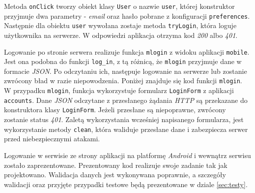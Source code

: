 

\vspace{1em}
Metoda \texttt{onClick} tworzy obiekt klasy \texttt{User} o nazwie \texttt{user}, której konstruktor przyjmuje dwa parametry - \emph{e\-mail} oraz hasło pobrane z konfiguracji \texttt{preferences}. Następnie dla obiektu \texttt{user} wywołana zostaje metoda \texttt{tryLogin}, która loguje użytkownika na serwerze. W odpowiedzi aplikacja otrzyma kod \emph{200} albo \emph{401}.

Logowanie po stronie serwera realizuje funkcja \texttt{mlogin} z widoku aplikacji \texttt{mobile}. Jest ona podobna do funkcji \texttt{log\_in}, z tą różnicą, że \texttt{mlogin} przyjmuje dane w formacie \emph{JSON}. Po odczytaniu ich, następuje logowanie na serwerze lub zostanie zwrócony bład w razie niepowodzenia. Poniżej znajduje się kod funkcji \texttt{mlogin}.\\

\vspace{1em}
W przypadku \texttt{mlogin}, funkcja wykorzystuje formularz \texttt{LoginForm} z aplikacji \texttt{accounts}. Dane \emph{JSON} odczytane z przesłanego żądania \emph{HTTP} są przekazane do konstruktora klasy \texttt{LoginForm}. Jeżeli przesłane są niepoprawne, zwrócony zostanie status \emph{401}. Zaletą wykorzystania wcześniej napisanego formularza, jest wykorzystanie metody \texttt{clean}, która waliduje przesłane dane i zabezpiecza serwer przed niebezpiecznymi atakami.

Logowanie w serwisie ze strony aplikacji na platformę \emph{Android} i wewnątrz serwisu zostało zaprezentowane. Prezentowany kod realizuje swoje zadanie tak jak projektowano. Walidacja danych jest wykonywana poprawnie, a szczegóły walidacji oraz przyjęte przypadki testowe będą prezentowane w dziale \ref{sec:testy}.